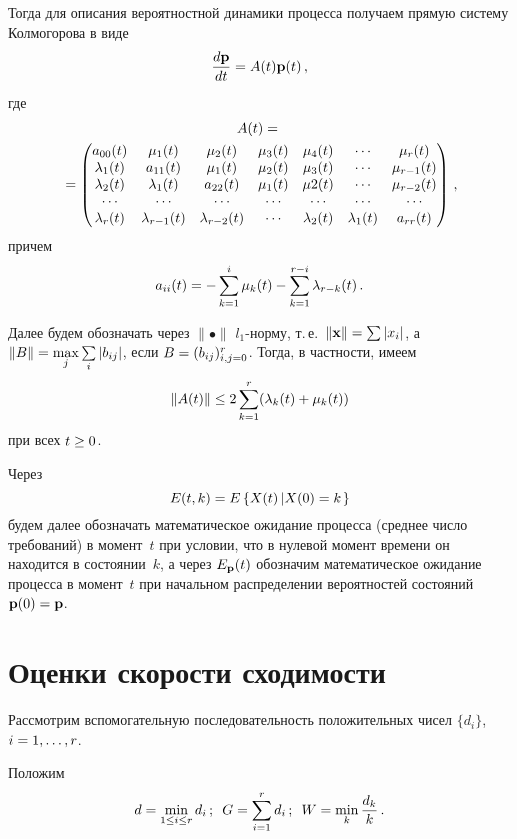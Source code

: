 \begin{multicols}{2}
Тогда для описания вероятностной динамики процесса получаем прямую систему Колмогорова в виде
\begin{equation} 
\displaystyle\frac{\displaystyle d{\mathbf p}\mathstrut}{\displaystyle dt\mathstrut}=A(t){\mathbf p}(t)\,,
\label{ur_1}
\end{equation}
 где
 {\footnotesize
\begin{multline*}
A(t)={}\\
{}=
\begin{pmatrix}
a_{00}(t) & \mu_1(t)  & \mu_2(t)   & \mu_3(t)  & \mu_4(t) & \cdots & \mu_r(t) \\
\lambda_1(t)   & a_{11}(t)  & \mu_1(t)  & \mu_2(t)   & \mu_3(t)  & \cdots & \mu_{r-1}(t) \\
\lambda_2(t)  & \lambda_1(t)    & a_{22}(t)& \mu_1(t)  & \mu2(t)    &  \cdots & \mu_{r-2}(t) \\
\cdots&\cdots&\cdots&\cdots&\cdots&\cdots&\cdots \\
\lambda_r(t) & \lambda_{r-1}(t) & \lambda_{r-2}(t) & \cdots & \lambda_2(t)  & \lambda_1 (t)   &  a_{rr}(t)
\end{pmatrix}\,,
\end{multline*}}
причем  
$$
a_{ii}(t)=-\sum\limits_{k=1}^{i}\mu_k(t) - \sum\limits_{k=1}^{r-i} \lambda_{r-k}(t)\,.
$$

Далее будем обозначать через $\|\bullet\|$  $l_1$-нор\-му, т.\,е.\ 
$\|{\vx}\|\hm=\sum|x_i|$, а $\|B\| \hm= \max\limits_j \sum\limits_i |b_{ij}|$, 
если $B \hm= (b_{ij})_{i,j=0}^{r}$.
%
Тогда, в частности, имеем 
$$
\|A(t)\| \le 2\sum\limits_{k=1}^{r}(\lambda_{k}(t)+ \mu_k(t))
$$ 
при  всех $t \hm\ge 0$.

Через 
$$
E(t,k) = E\left\{X(t)\left|X(0)\hm=k\right.\right\}
$$ 
будем далее обозначать математическое ожидание процесса (среднее число требований) в момент~$t$ 
при условии, что в нулевой момент времени он находится в состоянии~$k$, 
а через $E_{\bf p}(t)$ обозначим математическое ожидание процесса в момент~$t$ 
при начальном распределении вероятностей состояний $\mathbf{p}(0) \hm= \mathbf{p}$.

\section{Оценки скорости сходимости}

Рассмотрим вспомогательную последовательность положительных чисел $\{d_i\}$, $i\hm=1, \dots,r$.

Положим
\begin{equation*}
d=\min\limits_{1 \le i \le r} d_i\,; \enskip 
G=\sum\limits_{i=1}^r d_i\,; \enskip W=\min\limits_k \displaystyle\frac{\displaystyle d_k\mathstrut}{\displaystyle k\mathstrut}\,.
\end{equation*}


\end{multicols}
